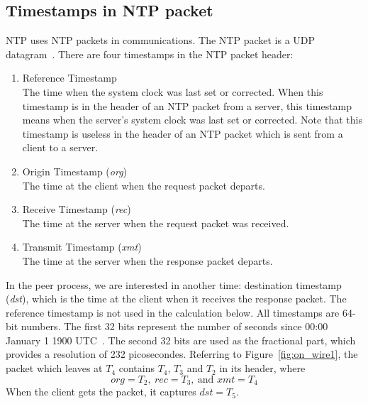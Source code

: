 \subsection{Timestamps in NTP packet}%
\label{sub:timestamps_in_ntp_packet}
NTP uses NTP packets in communications. The NTP packet is a UDP
datagram~\cite{rfc5905}. There are four timestamps in the NTP packet header:
\begin{enumerate}
    \item Reference Timestamp\\
        The time when the system clock was last set or corrected. When this
        timestamp is in the header of an NTP packet from a server, this
        timestamp means when the server's system clock was last set or
        corrected. Note that this timestamp is useless in the header of an NTP
        packet which is sent from a client to a server. 
    \item Origin Timestamp (\emph{org})\\
        The time at the client when the request packet departs.
    \item Receive Timestamp (\emph{rec})\\
        The time at the server when the request packet was received.
    \item Transmit Timestamp (\emph{xmt})\\
        The time at the server when the response packet departs.
\end{enumerate}
In the peer process, we are interested in another time: destination
timestamp (\emph{dst}), which is the time at the client when it receives the
response packet. The reference timestamp is not used in the calculation below.
All timestamps are 64-bit numbers. The first 32 bits represent the
number of seconds since 00:00 January 1 1900 UTC~\cite{rfc5905}. The second 32
bits are used as the fractional part, which provides a resolution of 232
picosecondes. Referring to Figure~\ref{fig:on_wire1}, the packet which leaves
at $T_4$ contains $T_4$, $T_3$ and $T_2$ in its header, where $$ \textit{org} =
T_2,~\textit{rec} = T_3,~\text{and }\textit{xmt} = T_4 $$ When the client gets
the packet, it captures $\textit{dst} = T_5$.

